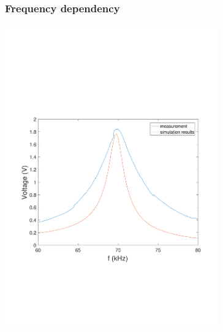 \documentclass[compress]{beamer}
\begin{document}
\begin{frame}\frametitle{Frequency dependency}
 \includegraphics[width=0.69\textwidth]{Graphic/03_volta_dyna_recta.pdf}
\end{frame}
\end{document}
